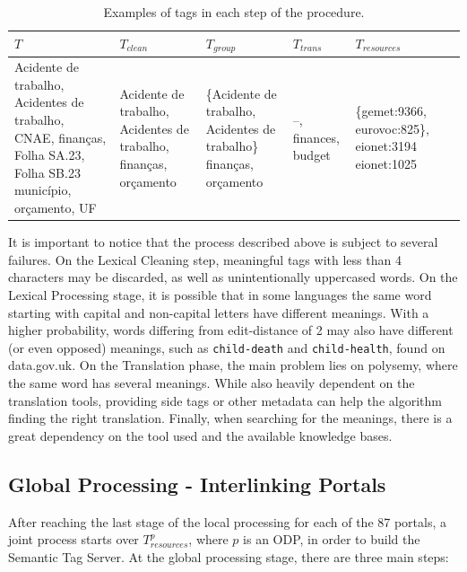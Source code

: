 \begin{table}[]
\centering
\ABNTEXfontereduzida
\caption{Examples of tags in each step of the procedure.}
\label{tab:local_example}
\begin{tabular}{|p{2cm}|p{2cm}|p{2cm}|p{2cm}|p{2cm}|p{2cm}|}
\hline
$T$ & $T_{clean}$ & $T_{group}$ & $T_{trans}$ & $T_{resources}$ \\ \hline
Acidente de trabalho,
Acidentes de trabalho,
CNAE,
finanças,
Folha SA.23,
Folha SB.23 
município,
orçamento,
UF
&
Acidente de trabalho,
Acidentes de trabalho,
finanças,
orçamento
&
\{Acidente de trabalho, Acidentes de trabalho\}
finanças,
orçamento
&
--,
finances,
budget
&
\{gemet:9366, eurovoc:825\},
eionet:3194
eionet:1025 \\ \hline
\end{tabular}
\end{table}

It is important to notice that the process described above is subject to several failures.
On the Lexical Cleaning step, meaningful tags with less than 4 characters may be discarded, as well as unintentionally uppercased words.
On the Lexical Processing stage, it is possible that in some languages the same word starting with capital and non-capital letters have different meanings.
With a higher probability, words differing from edit-distance of 2 may also have different (or even opposed) meanings, such as \texttt{child-death} and \texttt{child-health}, found on data.gov.uk.
On the Translation phase, the main problem lies on polysemy, where the same word has several meanings.
While also heavily dependent on the translation tools, providing side tags or other metadata can help the algorithm finding the right translation.
Finally, when searching for the meanings, there is a great dependency on the tool used and the available knowledge bases.

\subsection{Global Processing - Interlinking Portals}
\label{sec:global_building}

After reaching the last stage of the local processing for each of the 87 portals, a joint process starts over $T^p_{resources}$, where $p$ is an ODP, in order to build the Semantic Tag Server.
At the global processing stage, there are three main steps:


